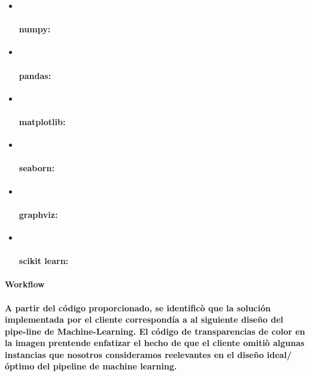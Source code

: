 \documentclass[]{article}
\let\oldparagraph\paragraph
\renewcommand{\paragraph}[1]{\oldparagraph{#1}\mbox{}}
\begin{document}
\begin{itemize}
\item ~
  \paragraph{\texorpdfstring{\textbf{numpy}:}{numpy:}}\label{numpy}
\item ~
  \paragraph{\texorpdfstring{\textbf{pandas}:}{pandas:}}\label{pandas}
\item ~
  \paragraph{\texorpdfstring{\textbf{matplotlib}:}{matplotlib:}}\label{matplotlib}
\item ~
  \paragraph{\texorpdfstring{\textbf{seaborn}:}{seaborn:}}\label{seaborn}
\item ~
  \paragraph{\texorpdfstring{\textbf{graphviz}:}{graphviz:}}\label{graphviz}
\item ~
  \paragraph{\texorpdfstring{\textbf{scikit
  learn}:}{scikit learn:}}\label{scikit-learn}
\end{itemize}

\paragraph{Workflow}\label{workflow}

\paragraph{A partir del código proporcionado, se identificò que la
solución implementada por el cliente correspondía a al siguiente diseño
del pipe-line de Machine-Learning. El código de transparencias de color
en la imagen prentende enfatizar el hecho de que el cliente omitiò
algunas instancias que nosotros consideramos reelevantes en el diseño
ideal/óptimo del pipeline de machine
learning.}\label{a-partir-del-codigo-proporcionado-se-identifico-que-la-solucion-implementada-por-el-cliente-correspondia-a-al-siguiente-diseno-del-pipe-line-de-machine-learning.-el-codigo-de-transparencias-de-color-en-la-imagen-prentende-enfatizar-el-hecho-de-que-el-cliente-omitio-algunas-instancias-que-nosotros-consideramos-reelevantes-en-el-diseno-idealoptimo-del-pipeline-de-machine-learning.}
\end{document}
